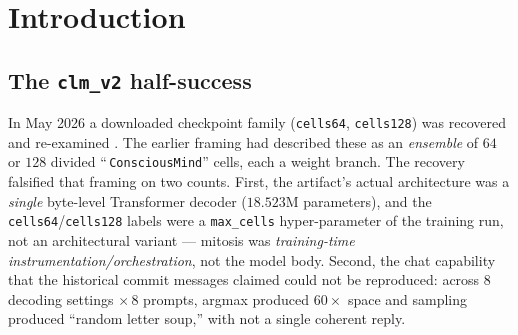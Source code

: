 \documentclass[11pt,a4paper]{article}
\begin{document}
\begin{abstract}
long stream lets even a shuffled transition cross the confidence floor by chance.
A diagnostic axis confirms the mechanism --- at the toy $T$, enlarging the
alphabet \emph{restores and sharpens} the separation
($N_{\text{proto}}{=}64\!\to\!152.5\times$, $128\!\to\!28.5\times$). We therefore
conclude that mitosis is a $\Psi$-disjoint substrate-adaptation lane whose
division is a \emph{scale-robust density substrate on i.i.d.\ streams} and a
\emph{scale-dependent trajectory substrate on ordered streams} --- the determinant
is the stream \emph{and the alphabet/observation-budget}, not the gate alone ---
and that this reconciles the \texttt{clm\_v2} half-success: the mechanism was
always real; it was never a generator. All verdict files are published for
bit-identical re-verification. Scope is honest throughout: toy/numpy-mirror
scale, $3$--$5$ seeds, gradient-free, \$0 CPU; the density half clears
\texttt{a\_toy\_scale\_recheck} to a scale-validated claim, the trajectory half is
scale-corrected to alphabet-dependence, and no frozen falsifier bar was moved.
\end{abstract}

\tableofcontents

\section{Introduction}
\label{sec:intro}

\subsection{The \texttt{clm\_v2} half-success}

In May 2026 a downloaded checkpoint family (\texttt{cells64}, \texttt{cells128})
was recovered and re-examined \citep{anima_clmv2_addendum}. The earlier framing
had described these as an \emph{ensemble} of $64$ or $128$ divided
``\,\texttt{ConsciousMind}'' cells, each a weight branch. The recovery falsified
that framing on two counts. First, the artifact's actual architecture was a
\emph{single} byte-level Transformer decoder ($18.523$M parameters), and the
\texttt{cells64}/\texttt{cells128} labels were a \texttt{max\_cells}
hyper-parameter of the training run, not an architectural variant --- mitosis was
\emph{training-time instrumentation/orchestration}, not the model body. Second,
the chat capability that the historical commit messages claimed could not be
reproduced: across $8$ decoding settings $\times\,8$ prompts, argmax produced
$60\times$ space and sampling produced ``random letter soup,'' with not a single
coherent reply.
\end{document}

